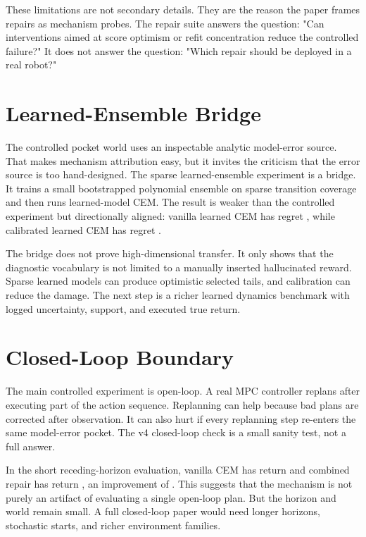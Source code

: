 These limitations are not secondary details. They are the reason the paper
frames repairs as mechanism probes. The repair suite answers the question:
"Can interventions aimed at score optimism or refit concentration reduce the
controlled failure?" It does not answer the question: "Which repair should be
deployed in a real robot?"

\section{Learned-Ensemble Bridge}
\label{app:learned-bridge}

The controlled pocket world uses an inspectable analytic model-error source.
That makes mechanism attribution easy, but it invites the criticism that the
error source is too hand-designed. The sparse learned-ensemble experiment is a
bridge. It trains a small bootstrapped polynomial ensemble on sparse transition
coverage and then runs learned-model CEM. The result is weaker than the
controlled experiment but directionally aligned: vanilla learned CEM has regret
\VFourLearnedCEMRegret{}, while calibrated learned CEM has regret
\VFourLearnedCalibratedRegret{}.

The bridge does not prove high-dimensional transfer. It only shows that the
diagnostic vocabulary is not limited to a manually inserted hallucinated
reward. Sparse learned models can produce optimistic selected tails, and
calibration can reduce the damage. The next step is a richer learned dynamics
benchmark with logged uncertainty, support, and executed true return.

\section{Closed-Loop Boundary}
\label{app:closed-loop}

The main controlled experiment is open-loop. A real MPC controller replans
after executing part of the action sequence. Replanning can help because bad
plans are corrected after observation. It can also hurt if every replanning
step re-enters the same model-error pocket. The v4 closed-loop check is a
small sanity test, not a full answer.

In the short receding-horizon evaluation, vanilla CEM has return
\VFourClosedLoopCEM{} and combined repair has return
\VFourClosedLoopRepair{}, an improvement of \VFourClosedLoopGain{}. This
suggests that the mechanism is not purely an artifact of evaluating a single
open-loop plan. But the horizon and world remain small. A full closed-loop
paper would need longer horizons, stochastic starts, and richer environment
families.

